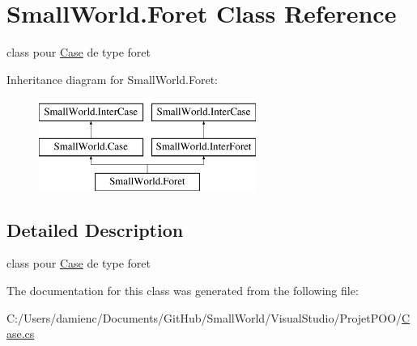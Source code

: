 \hypertarget{class_small_world_1_1_foret}{\section{Small\-World.\-Foret Class Reference}
\label{class_small_world_1_1_foret}
}


class pour \hyperlink{class_small_world_1_1_case}{Case} de type foret  


Inheritance diagram for Small\-World.\-Foret\-:\begin{figure}[H]
\begin{center}
\leavevmode
\includegraphics[height=3.000000cm]{class_small_world_1_1_foret}
\end{center}
\end{figure}


\subsection{Detailed Description}
class pour \hyperlink{class_small_world_1_1_case}{Case} de type foret 

The documentation for this class was generated from the following file\-:\begin{DoxyCompactItemize}
\item 
C\-:/\-Users/damienc/\-Documents/\-Git\-Hub/\-Small\-World/\-Visual\-Studio/\-Projet\-P\-O\-O/\hyperlink{_case_8cs}{Case.\-cs}\end{DoxyCompactItemize}
